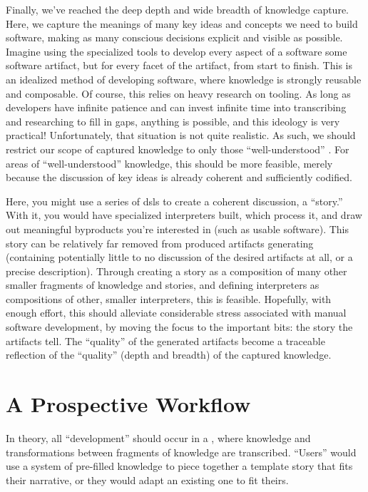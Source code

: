 Finally, we've reached the deep depth and wide breadth of knowledge capture.
Here, we capture the meanings of many key ideas and concepts we need to build
software, making as many conscious decisions explicit and visible as possible.
Imagine using the specialized tools to develop every aspect of a software some
software artifact, but for every facet of the artifact, from start to finish.
This is an idealized method of developing software, where knowledge is strongly
reusable and composable. Of course, this relies on heavy research on tooling. As
long as developers have infinite patience and can invest infinite time into
transcribing and researching to fill in gaps, anything is possible, and this
ideology is very practical! Unfortunately, that situation is not quite
realistic. As such, we should restrict our scope of captured knowledge to only
those ``well-understood'' \cite{well-understood}. For areas of
``well-understood'' knowledge, this should be more feasible, merely because the
discussion of key ideas is already coherent and sufficiently codified.

Here, you might use a series of \aclp{dsl} to create a coherent discussion, a
``story.'' With it, you would have specialized interpreters built, which process
it, and draw out meaningful byproducts you're interested in (such as usable
software). This story can be relatively far removed from produced artifacts
generating (containing potentially little to no discussion of the desired
artifacts at all, or a precise description). Through creating a story as a
composition of many other smaller fragments of knowledge and stories, and
defining interpreters as compositions of other, smaller interpreters, this is
feasible. Hopefully, with enough effort, this should alleviate considerable
stress associated with manual software development, by moving the focus to the
important bits: the story the artifacts tell. The ``quality'' of the generated
artifacts become a traceable reflection of the ``quality'' (depth and breadth)
of the captured knowledge.

\section{A Prospective Workflow}
\label{chap:ideology:sec:a_prospective_workflow}

In theory, all ``development'' should occur in a , where knowledge and
transformations between fragments of knowledge are transcribed. ``Users'' would
use a system of pre-filled knowledge to piece together a template story that
fits their narrative, or they would adapt an existing one to fit theirs.

